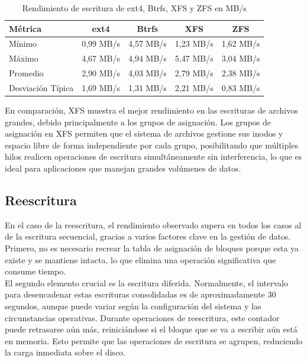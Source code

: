 \begin{table}[h!]
    \centering
    \caption{Rendimiento de escritura de ext4, Btrfs, XFS y ZFS en MB/s}
    \begin{tabular}{|l|c|c|c|c|}
        \hline
        \textbf{Métrica}  & \textbf{ext4} & \textbf{Btrfs} & \textbf{XFS}  & \textbf{ZFS}  \\ \hline
        Mínimo            & 0,99 MB/s   & 4,57 MB/s   & 1,23 MB/s   & 1,62 MB/s  \\ \hline
        Máximo            & 4,67 MB/s & 4,94 MB/s  & 5,47 MB/s & 3,04 MB/s \\ \hline
        Promedio          & 2,90 MB/s & 4,03 MB/s  & 2,79 MB/s & 2,38 MB/s  \\ \hline
        Desviación Típica & 1,69 MB/s  & 1,31 MB/s   & 2,21 MB/s  & 0,83 MB/s  \\ \hline
    \end{tabular}
    \label{tab:rendimiento_escritura_sistemas_archivos}
\end{table}

En comparación, XFS muestra el mejor rendimiento en las escrituras de archivos grandes, debido principalmente a los grupos de asignación. Los grupos de asignación en XFS permiten que el sistema de archivos gestione sus inodos y espacio libre de forma independiente por cada grupo, posibilitando que múltiples hilos realicen operaciones de escritura simultáneamente sin interferencia, lo que es ideal para aplicaciones que manejan grandes volúmenes de datos.

\subsection{Reescritura}

En el caso de la reescritura, el rendimiento observado supera en todos los casos al de la escritura secuencial, gracias a varios factores clave en la gestión de datos. Primero, no es necesario recrear la tabla de asignación de bloques porque esta ya existe y se mantiene intacta, lo que elimina una operación significativa que consume tiempo. \\

El segundo elemento crucial es la escritura diferida. Normalmente, el intervalo para desencadenar estas escrituras consolidadas es de aproximadamente 30 segundos, aunque puede variar según la configuración del sistema y las circunstancias operativas. Durante operaciones de reescritura, este contador puede retrasarse aún más, reiniciándose si el bloque que se va a escribir aún está en memoria. Esto permite que las operaciones de escritura se agrupen, reduciendo la carga inmediata sobre el disco. \\

